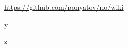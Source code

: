 \renewcommand\bibname{References}
\begin{thebibliography}{99}

 \url{https://github.com/ponyatov/no/wiki}

 y

 z

\end{thebibliography}